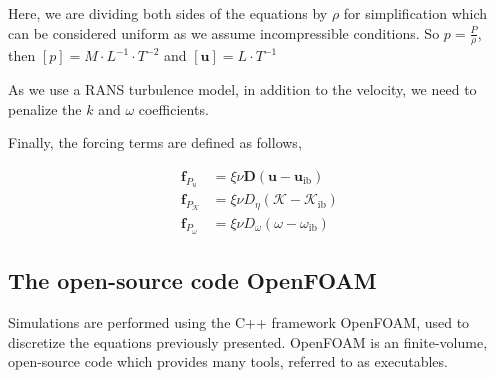 
Here, we are dividing both sides of the equations by $\rho$ for simplification which can be considered uniform as we assume incompressible conditions. So $p = \frac{P}{\rho}$, then $[p] = M \cdot L^{-1} \cdot T^{-2}$ and $[\boldsymbol{u}] = L \cdot T^{-1}$


As we use a RANS turbulence model, in addition to the velocity, we need to penalize the $k$ and $\omega$ coefficients.




Finally, the forcing terms are defined as follows,

\begin{align}
    \label{eq:IB}
    \boldsymbol{f}_{P_u} &= \xi \nu \boldsymbol{D} \left( \boldsymbol{u} - \boldsymbol{u}_{\text{ib}} \right) \\
    \boldsymbol{f}_{P_\mathcal{K}} &= \xi \nu D_{\eta} \left( \mathcal{K} - \mathcal{K}_{\text{ib}} \right) \\
    \boldsymbol{f}_{P_\omega} &= \xi \nu D_{\omega} \left( \omega - \omega_{\text{ib}} \right)
\end{align}









\subsection{The open-source code OpenFOAM}


Simulations are performed using the C++ framework OpenFOAM, used to discretize the equations previously presented. OpenFOAM is an finite-volume, open-source code which provides many tools, referred to as executables. %

